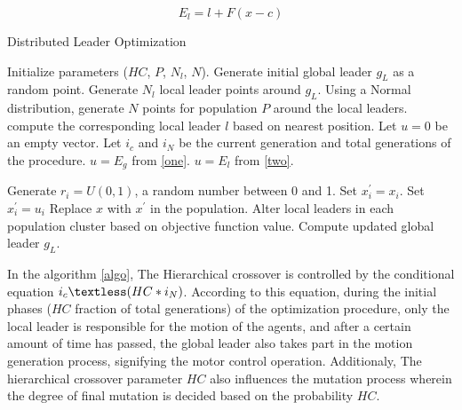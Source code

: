 \begin{equation}
\label{two}
E_l = l + F (x - c)
\end{equation}

\begin{algorithm}
\caption{Distributed Leader Optimization}
\label{algo}
\begin{algorithmic}[1]
    \State Initialize parameters ($HC$, $P$, $N_l$, $N$).
    \State Generate initial global leader $g_L$ as a random point.
    \State Generate $N_l$ local leader points around $g_L$.
    \State Using a Normal distribution, generate $N$ points for population $P$ around the local leaders.
        \State compute the corresponding local leader $l$ based on nearest position.
        \State Let $u = 0$ be an empty vector.
        \State Let $i_c$ and $i_N$ be the current generation and total generations of the procedure.
          \State $u = E_g$ from \eqref{one}.
        \Else
          \State $u = E_l$ from \eqref{two}.
        \EndIf
        
          \State Generate $r_i = U(0, 1)$, a random number between 0 and 1.
            \State Set $x_i^{'} = x_i$.
          \Else
            \State Set $x_i^{'} = u_i$
          \EndIf
        \EndFor
          \State Replace $x$ with $x^{'}$ in the population.
        \EndIf
      \EndFor
      \State Alter local leaders in each population cluster based on objective function value.
      \State Compute updated global leader $g_L$.
    \EndWhile
  \EndProcedure
\end{algorithmic}
\end{algorithm}

In the algorithm \ref{algo}, The Hierarchical crossover is controlled by the conditional equation $i_c \textless (HC*i_N)$. According to this equation, during the initial phases ($HC$ fraction of total generations) of the optimization procedure, only the local leader is responsible for the motion of the agents, and after a certain amount of time has passed, the global leader also takes part in the motion generation process, signifying the motor control operation.
Additionaly, The hierarchical crossover parameter $HC$ also influences the mutation process wherein the degree of final mutation is decided based on the probability $HC$.

